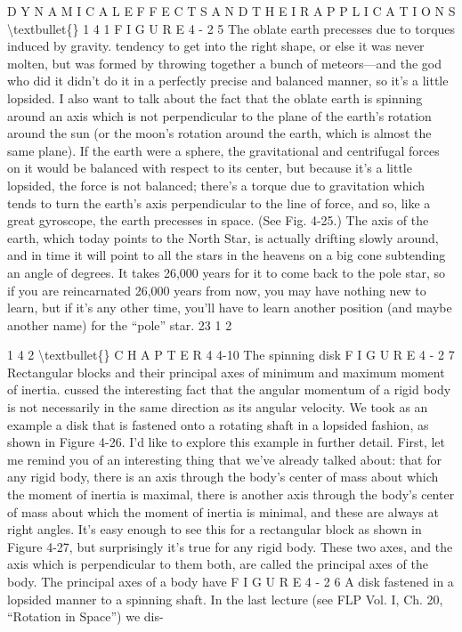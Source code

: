 \documentclass[10pt,oneside]{article}
\begin{document}
D Y N A M I C A L  E F F E C T S  A N D  T H E I R  A P P L I C A T I O N S \textbackslash{}textbullet\{\} 1 4 1 F I G U R E  4 - 2 5 The oblate earth precesses due to torques induced by gravity. tendency to get into the right shape, or else it was never molten, but was formed by throwing together a bunch of meteors---and the god who did it didn’t do it in a perfectly precise and balanced manner, so it’s a little lopsided. I also want to talk about the fact that the oblate earth is spinning around an axis which is not perpendicular to the plane of the earth’s rotation around the sun (or the moon’s rotation around the earth, which is almost the same plane). If the earth were a sphere, the gravitational and centrifugal forces on it would be balanced with respect to its center, but because it’s a little lopsided, the force is not balanced; there’s a torque due to gravitation which tends to turn the earth’s axis perpendicular to the line of force, and so, like a great gyroscope, the earth precesses in space. (See Fig. 4-25.) The axis of the earth, which today points to the North Star, is actually drifting slowly around, and in time it will point to all the stars in the heavens on a big cone subtending an angle of degrees. It takes 26,000 years for it to come back to the pole star, so if you are reincarnated 26,000 years from now, you may have nothing new to learn, but if it’s any other time, you’ll have to learn another position (and maybe another name) for the “pole” star. 23 1 2\par

1 4 2 \textbackslash{}textbullet\{\} C H A P T E R  4 4-10 The spinning disk F I G U R E  4 - 2 7 Rectangular blocks and their principal axes of minimum and maximum moment of inertia. cussed the interesting fact that the angular momentum of a rigid body is not necessarily in the same direction as its angular velocity. We took as an example a disk that is fastened onto a rotating shaft in a lopsided fashion, as shown in Figure 4-26. I’d like to explore this example in further detail. First, let me remind you of an interesting thing that we’ve already talked about: that for any rigid body, there is an axis through the body’s center of mass about which the moment of inertia is maximal, there is another axis through the body’s center of mass about which the moment of inertia is minimal, and these are always at right angles. It’s easy enough to see this for a rectangular block as shown in Figure 4-27, but surprisingly it’s true for any rigid body. These two axes, and the axis which is perpendicular to them both, are called the principal axes of the body. The principal axes of a body have F I G U R E  4 - 2 6 A disk fastened in a lopsided manner to a spinning shaft. In the last lecture (see FLP Vol. I, Ch. 20, “Rotation in Space”) we dis-\par
\end{document}
